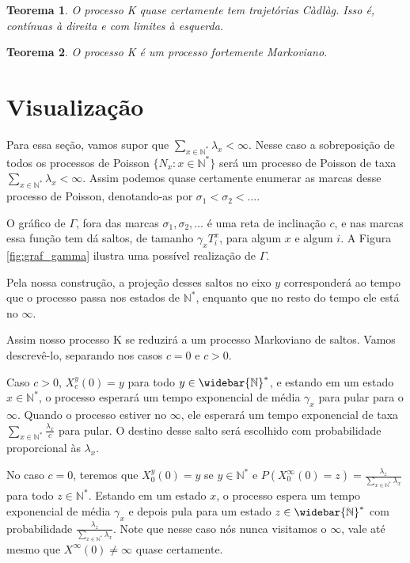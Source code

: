 \documentclass[11pt,twoside,a4paper]{article}
\newcommand{\Nz}{{\mathbb{N^*}}}
\newcommand{\Nzb}{{\mathbb{\widebar{N}^*}}}
\newtheorem{teorema}{Teorema}[section]
\begin{document}
\begin{teorema}
  O processo K quase certamente tem trajetórias Càdlàg. Isso é,
  contínuas à direita e com limites à esquerda.
\end{teorema}

\begin{teorema}
  O processo K é um processo fortemente Markoviano.
\end{teorema}



\section{Visualização}
\label{sec:visualizacao}

Para essa seção, vamos supor que $\sum_{x \in \Nz} \lambda_x <
\infty$. Nesse caso a sobreposição de todos os processos de Poisson
$\{N_x : x \in \Nz\}$ será um processo de Poisson de taxa $\sum_{x \in
  \Nz} \lambda_x < \infty$. Assim podemos quase certamente enumerar as
marcas desse processo de Poisson, denotando-as por $ \sigma_1 < \sigma_2 <
\ldots$.

O gráfico de $\Gamma$, fora das marcas $\sigma_1, \sigma_2,
\ldots$ é uma reta de inclinação $c$, e nas marcas
essa função tem dá saltos, de tamanho $\gamma_x T^x_i$, para algum $x$
e algum $i$. A Figura \ref{fig:graf_gamma} ilustra uma possível
realização de $\Gamma$.


Pela nossa construção, a projeção desses saltos no eixo $y$
corresponderá ao tempo que o processo passa nos estados de $\Nz$,
enquanto que no resto do tempo ele está no $\infty$.

Assim nosso processo K se reduzirá a um processo Markoviano de
saltos. Vamos descrevê-lo, separando nos casos $c = 0$ e $c > 0$.

Caso $c > 0$, $X^y_c(0) = y$ para todo $y \in \Nzb$, e estando em um
estado $x \in \Nz$, o processo esperará um tempo exponencial de média
$\gamma_x$ para pular para o $\infty$.
Quando o processo estiver no $\infty$, ele esperará um tempo
exponencial de taxa $\sum_{x \in \Nz} \frac{\lambda_x}{c}$ para
pular. O destino desse salto será escolhido com probabilidade
proporcional às $\lambda_x$.

No caso $c=0$, teremos que $X^y_0(0) = y$ se $y \in \Nz$ e
$P(X^\infty_0(0) = z) = \frac{\lambda_z}{\sum_{x\in\Nz} \lambda_x}$
para todo $z \in \Nz$.  Estando em um estado $x$, o processo espera um
tempo exponencial de média $\gamma_x$ e depois pula para um estado $z
\in \Nzb$ com probabilidade $\frac{\lambda_z}{\sum_{x\in\Nz}
  \lambda_x}$.  Note que nesse caso nós nunca visitamos o $\infty$,
vale até mesmo que $X^\infty(0) \neq \infty$ quase certamente.
\end{document}
